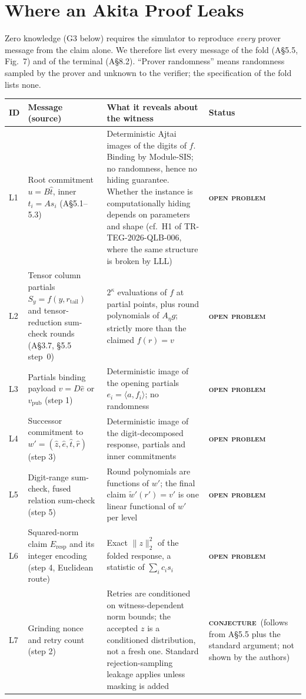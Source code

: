 \documentclass[11pt]{article}
\newcommand{\epitag}[3]{\colorbox{#2}{\textcolor{#1}{\textsc{\footnotesize\bfseries #3}}}}
\newcommand{\conjectureTag}{\epitag{conjyellow}{conjbg}{conjecture}}
\newcommand{\openproblem}{\epitag{openred}{openbg}{open problem}}
\renewcommand{\_}{\textunderscore\allowbreak{}}
\theoremstyle{definition}
\begin{document}
\section{Where an Akita Proof Leaks}
\label{sec:leak}
Zero knowledge (G3 below) requires the simulator to reproduce \emph{every} prover message from the claim alone. We therefore list every message of the fold (A\S5.5, Fig.~7) and of the terminal (A\S8.2).
``Prover randomness'' means randomness sampled by the prover and unknown to the verifier; the specification of the fold lists none.

\begin{center}
\small\renewcommand{\arraystretch}{1.18}
\begin{longtable}{@{}p{}p{}p{}p{}@{}}
\toprule
\textbf{ID} & \textbf{Message (source)} & \textbf{What it reveals about the witness} & \textbf{Status}\\
\midrule
\endhead
L1 & Root commitment $u=B\hat t$, inner $t_i=As_i$ (A\S5.1--5.3) & Deterministic Ajtai images of the digits of $f$. Binding by Module-SIS; no randomness, hence no hiding guarantee. Whether the instance is computationally hiding depends on parameters and shape (cf.\ H1 of TR-TEG-2026-QLB-006, where the same structure is broken by LLL) & \openproblem\\
L2 & Tensor column partials $S_y=f(y,r_{\mathrm{tail}})$ and tensor-reduction sum-check rounds (A\S3.7, \S5.5 step~0) & $2^\kappa$ evaluations of $f$ at partial points, plus round polynomials of $A_\eta g$; strictly more than the claimed $f(r)=v$ & \openproblem\\
L3 & Partials binding payload $v=D\hat e$ or $v_{\mathrm{pub}}$ (step 1) & Deterministic image of the opening partials $e_i=\langle a,f_i\rangle$; no randomness & \openproblem\\
L4 & Successor commitment to $w'=(\hat z,\hat e,\hat t,\hat r)$ (step 3) & Deterministic image of the digit-decomposed response, partials and inner commitments & \openproblem\\
L5 & Digit-range sum-check, fused relation sum-check (step 5) & Round polynomials are functions of $w'$; the final claim $\tilde w'(r')=v'$ is one linear functional of $w'$ per level & \openproblem\\
L6 & Squared-norm claim $E_{\mathrm{resp}}$ and its integer encoding (step 4, Euclidean route) & Exact $\|z\|_2^2$ of the folded response, a statistic of $\sum_i c_is_i$ & \openproblem\\
L7 & Grinding nonce and retry count (step 2) & Retries are conditioned on witness-dependent norm bounds; the accepted $z$ is a conditioned distribution, not a fresh one. Standard rejection-sampling leakage applies unless masking is added & \conjectureTag\ (follows from A\S5.5 plus the standard argument; not shown by the authors)\\

\end{longtable}
\end{center}
\end{document}
